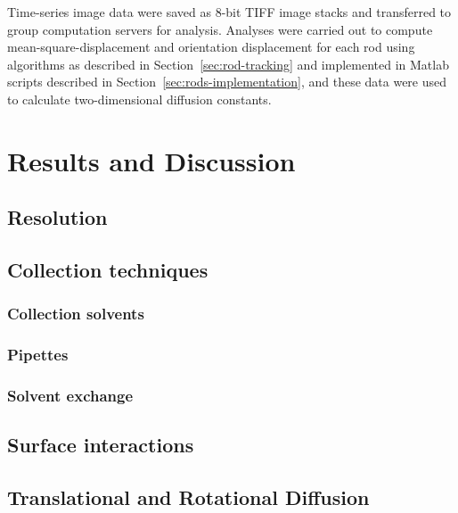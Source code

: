 Time-series image data were saved as 8-bit TIFF image stacks and transferred to group computation servers for analysis.
Analyses were carried out to compute mean-square-displacement and orientation displacement for each rod using algorithms as 
described in Section~\ref{sec:rod-tracking} and implemented in Matlab scripts described in Section~\ref{sec:rods-implementation}, 
and these data
were used to calculate two-dimensional diffusion constants.  

\section{Results and Discussion}

\subsection{Resolution}

\subsection{Collection techniques}
\label{sec:rod-collection-techniques}

\subsubsection{Collection solvents}

\subsubsection{Pipettes}

\subsubsection{Solvent exchange}

\subsection{Surface interactions}
\label{sec:surface-interact}

\subsection{Translational and Rotational Diffusion}

